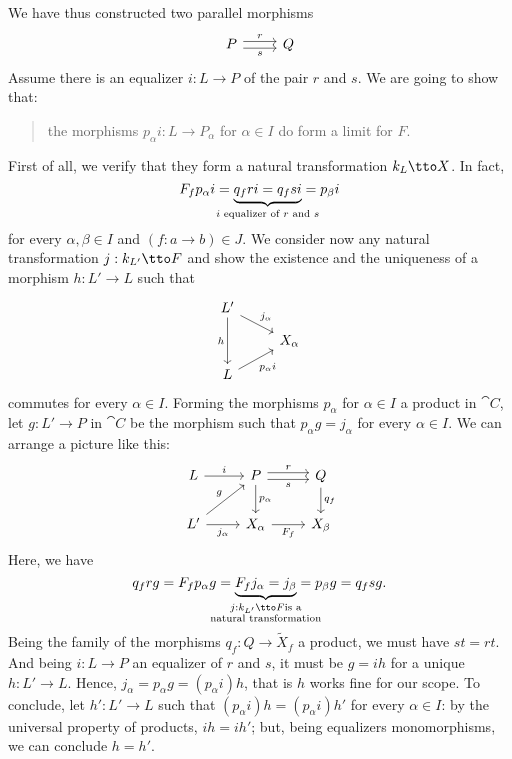 We have thus constructed two parallel morphisms
\[\begin{tikzcd}
    P \ar["r", r, shift left] \ar["s", r, shift right, swap] & Q
  \end{tikzcd}\] Assume there is an equalizer \(i : L \to P\) of the
pair \(r\) and \(s\). We are going to show that:
\begin{quotation}
  the morphisms \(p_\alpha i : L \to P_\alpha\) for \(\alpha \in I\) do form a limit for
  \(F\).
\end{quotation}
First of all, we verify that they form a natural transformation
\(k_L \tto X\). In fact,
\[F_f p_\alpha i = \underbrace{q_f r i = q_f s i}_{\mathclap{i \text{
        equalizer of } r \text{ and } s}} = p_\beta i\] for every
\(\alpha, \beta \in I\) and \((f : a \to b) \in J\). We consider now any natural
transformation \(j : k_{L'} \tto F\) and show the existence and the
uniqueness of a morphism \(h : L' \to L\) such that
\[\begin{tikzcd}[row sep=small]
    L' \ar["{j_\alpha}", dr] \ar["h", dd, swap] \\
    & X_\alpha \\
    L \ar["{p_\alpha i}", ur, swap]
  \end{tikzcd}\] commutes for every \(\alpha \in I\). Forming the morphisms
\(p_\alpha\) for \(\alpha \in I\) a product in \(\cat C\), let
\(g : L' \to P\) in \(\cat C\) be the morphism such that
\(p_\alpha g = j_\alpha\) for every \(\alpha \in I\). We can arrange a picture like
this:
\[\begin{tikzcd}
    L \ar["i", r] & P \ar["r", r, shift left] \ar["s", r, shift right, swap] \ar["{p_\alpha}", d] & Q \ar["{q_f}", d] \\
    L' \ar["{j_\alpha}", r, swap] \ar["g", ur] & X_\alpha \ar["{F_f}", r, swap]
    & X_\beta
  \end{tikzcd}\] Here, we have
\[q_f r g = F_f p_\alpha g = \underbrace{F_f j_\alpha =
    j_\beta}_{\mathclap{\substack{j : k_{L'} \tto F \text{is a} \\
        \text{natural transformation}}}} = p_\beta g = q_f s g .\] Being
the family of the morphisms \(q_f : Q \to \tilde X_f\) a product, we
must have \(s t = r t\). And being \(i : L \to P\) an equalizer of
\(r\) and \(s\), it must be \(g = i h\) for a unique \(h : L' \to
L\). Hence, \(j_\alpha = p_\alpha g = (p_\alpha i) h\), that is \(h\) works fine for
our scope. To conclude, let \(h' : L' \to L\) such that
\((p_\alpha i) h = (p_\alpha i ) h'\) for every \(\alpha \in I\): by the universal
property of products, \(i h = i h'\); but, being equalizers
monomorphisms, we can conclude \(h = h'\).

